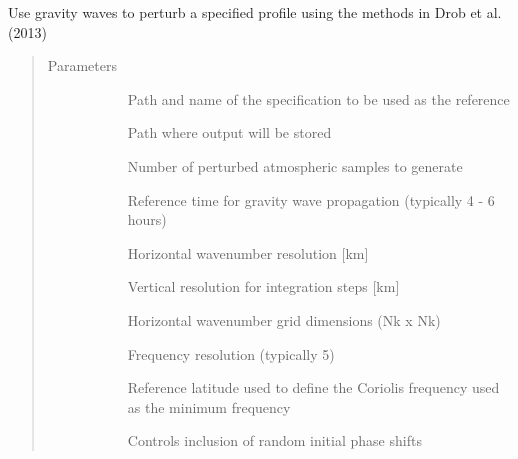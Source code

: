 \documentclass[letterpaper,10pt,english]{sphinxmanual}
\begin{document}
\begin{fulllineitems}
\label{\detokenize{stochprop.gravity:stochprop.gravity_waves.perturb_atmo}}
Use gravity waves to perturb a specified profile using the methods in Drob et al. (2013)
\begin{quote}\begin{description}
\item[{Parameters}] \leavevmode\begin{description}
\item[{}] \leavevmode
Path and name of the specification to be used as the reference

\item[{}] \leavevmode
Path where output will be stored

\item[{}] \leavevmode
Number of perturbed atmospheric samples to generate

\item[{}] \leavevmode
Reference time for gravity wave propagation (typically 4 - 6 hours)

\item[{}] \leavevmode
Horizontal wavenumber resolution {[}km{]}

\item[{}] \leavevmode
Vertical resolution for integration steps {[}km{]}

\item[{}] \leavevmode
Horizontal wavenumber grid dimensions (Nk x Nk)

\item[{}] \leavevmode
Frequency resolution (typically 5)

\item[{}] \leavevmode
Reference latitude used to define the Coriolis frequency used as the minimum frequency

\item[{}] \leavevmode
Controls inclusion of random initial phase shifts


\end{description}
\end{description}
\end{quote}
\end{fulllineitems}
\end{document}
